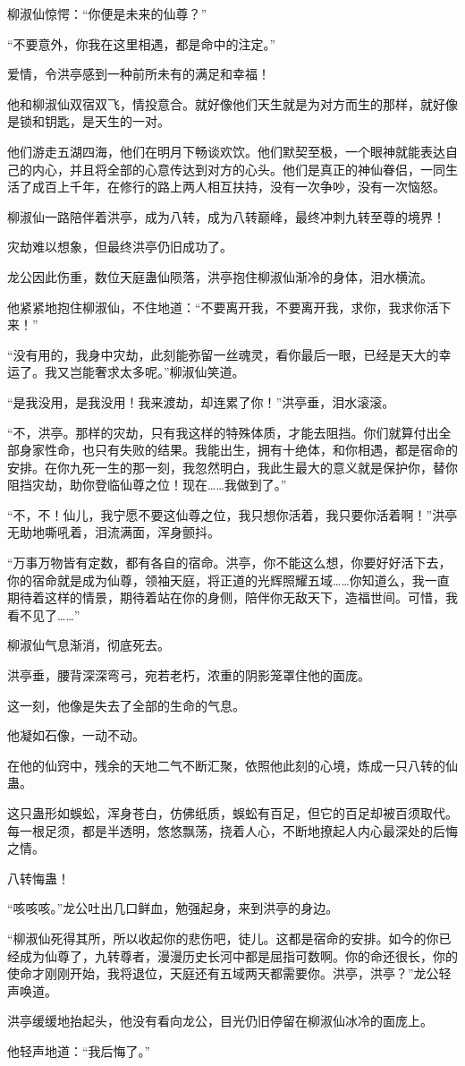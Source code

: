 \begin{this_body}
柳淑仙惊愕：“你便是未来的仙尊？”

“不要意外，你我在这里相遇，都是命中的注定。”

爱情，令洪亭感到一种前所未有的满足和幸福！

他和柳淑仙双宿双飞，情投意合。就好像他们天生就是为对方而生的那样，就好像是锁和钥匙，是天生的一对。

他们游走五湖四海，他们在明月下畅谈欢饮。他们默契至极，一个眼神就能表达自己的内心，并且将全部的心意传达到对方的心头。他们是真正的神仙眷侣，一同生活了成百上千年，在修行的路上两人相互扶持，没有一次争吵，没有一次恼怒。

柳淑仙一路陪伴着洪亭，成为八转，成为八转巅峰，最终冲刺九转至尊的境界！

灾劫难以想象，但最终洪亭仍旧成功了。

龙公因此伤重，数位天庭蛊仙陨落，洪亭抱住柳淑仙渐冷的身体，泪水横流。

他紧紧地抱住柳淑仙，不住地道：“不要离开我，不要离开我，求你，我求你活下来！”

“没有用的，我身中灾劫，此刻能弥留一丝魂灵，看你最后一眼，已经是天大的幸运了。我又岂能奢求太多呢。”柳淑仙笑道。

“是我没用，是我没用！我来渡劫，却连累了你！”洪亭垂，泪水滚滚。

“不，洪亭。那样的灾劫，只有我这样的特殊体质，才能去阻挡。你们就算付出全部身家性命，也只有失败的结果。我能出生，拥有十绝体，和你相遇，都是宿命的安排。在你九死一生的那一刻，我忽然明白，我此生最大的意义就是保护你，替你阻挡灾劫，助你登临仙尊之位！现在……我做到了。”

“不，不！仙儿，我宁愿不要这仙尊之位，我只想你活着，我只要你活着啊！”洪亭无助地嘶吼着，泪流满面，浑身颤抖。

“万事万物皆有定数，都有各自的宿命。洪亭，你不能这么想，你要好好活下去，你的宿命就是成为仙尊，领袖天庭，将正道的光辉照耀五域……你知道么，我一直期待着这样的情景，期待着站在你的身侧，陪伴你无敌天下，造福世间。可惜，我看不见了……”

柳淑仙气息渐消，彻底死去。

洪亭垂，腰背深深弯弓，宛若老朽，浓重的阴影笼罩住他的面庞。

这一刻，他像是失去了全部的生命的气息。

他凝如石像，一动不动。

在他的仙窍中，残余的天地二气不断汇聚，依照他此刻的心境，炼成一只八转的仙蛊。

这只蛊形如蜈蚣，浑身苍白，仿佛纸质，蜈蚣有百足，但它的百足却被百须取代。每一根足须，都是半透明，悠悠飘荡，挠着人心，不断地撩起人内心最深处的后悔之情。

八转悔蛊！

“咳咳咳。”龙公吐出几口鲜血，勉强起身，来到洪亭的身边。

“柳淑仙死得其所，所以收起你的悲伤吧，徒儿。这都是宿命的安排。如今的你已经成为仙尊了，九转尊者，漫漫历史长河中都是屈指可数啊。你的命还很长，你的使命才刚刚开始，我将退位，天庭还有五域两天都需要你。洪亭，洪亭？”龙公轻声唤道。

洪亭缓缓地抬起头，他没有看向龙公，目光仍旧停留在柳淑仙冰冷的面庞上。

他轻声地道：“我后悔了。”

\end{this_body}

